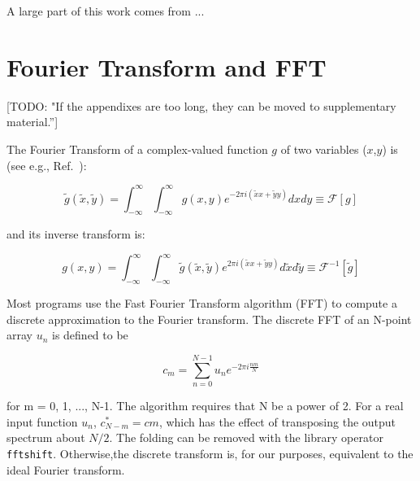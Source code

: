 \documentclass{iucr}              %
\newcommand{\todo}[1]{{\color{red}[TODO: "#1'']}}
\begin{document}
%
%
A large part of this work comes from ...

\appendix
\section{Fourier Transform and FFT}
\label{appendix_fft}

\todo{If the appendixes are too long, they can be moved to supplementary material.}

The Fourier Transform of a complex-valued function $g$ of two variables ($x$,$y$) is (see e.g., Ref.~\cite{goodmanfourier}): 

\begin{equation}
\tilde{g}(\tilde{x},\tilde{y}) = \int_{-\infty}^\infty \int_{-\infty}^\infty g(x,y) e^{-2 \pi i (\tilde{x}x + \tilde{y}y)} dx dy \equiv \mathcal{F}[g]
\end{equation}

and its inverse transform is: 

\begin{equation}
g(x,y) = \int_{-\infty}^\infty \int_{-\infty}^\infty \tilde{g}(\tilde{x},\tilde{y}) e^{2 \pi i (\tilde{x}x + \tilde{y}y)} d\tilde{x} d\tilde{y} \equiv \mathcal{F}^{-1}[\tilde{g}]
\end{equation}

Most programs use the Fast Fourier Transform algorithm (FFT) to compute a discrete approximation to the Fourier transform. The discrete FFT of an N-point array
$u_n$ is defined to be

\begin{equation}
 c_m = \sum_{n=0}^{N-1} u_n e^{-2 \pi i \frac{n m}{N}}
\end{equation}

for m = 0, 1, ..., N-1. The algorithm requires that N be a power of 2. For a real input function $u_n$, $c_{N-m}^\ast = cm$, which has the effect of transposing the output spectrum about $N/2$. The folding can be removed with the library operator {\tt fftshift}. Otherwise,the discrete transform is, for our purposes, equivalent to the ideal Fourier transform.
\end{document}
